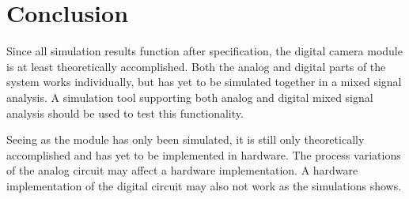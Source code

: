 \section{Conclusion}
Since all simulation results function after specification, the digital camera module is at least theoretically accomplished. 
Both the analog and digital parts of the system works individually, but has yet to be simulated together in a mixed signal analysis. 
A simulation tool supporting both analog and digital mixed signal analysis should be used to test this functionality.

Seeing as the module has only been simulated, it is still only theoretically accomplished and has yet to be implemented in hardware. 
The process variations of the analog circuit may affect a hardware implementation. 
A hardware implementation of the digital circuit may also not work as the simulations shows.
